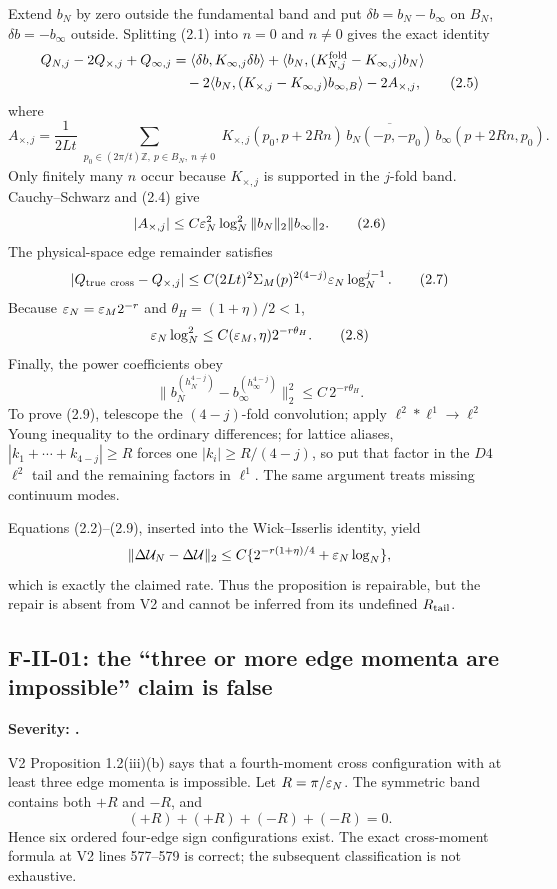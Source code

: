 \documentclass[11pt,a4paper]{article}
\begin{document}
Extend $b_N$ by zero outside the fundamental band and put
$\delta b=b_N-b_\infty$ on $B_N$, $\delta b=-b_\infty$ outside.  Splitting (2.1) into
$n=0$ and $n\ne0$ gives the exact identity
\begin{align*}
 Q_{N,j}-2Q_{\times,j}+Q_{\infty,j}
 &=\langle\delta b,K_{\infty,j}\delta b\rangle
 +\langle b_N,(K_{N,j}^{\rm fold}-K_{\infty,j})b_N\rangle\\
 &\quad-2\langle b_N,(K_{\times,j}-K_{\infty,j})b_{\infty,B}\rangle
 -2A_{\times,j},\tag{2.5}
\end{align*}
where
\[
 A_{\times,j}=\frac1{2Lt}
 \sum_{\substack{p_0\in(2\pi/t)\mathbb Z,\ p\in B_N,\ n\ne0}}
 K_{\times,j}(p_0,p+2Rn)\,
 \overline{b_N(-p,-p_0)}\,b_\infty(p+2Rn,p_0).
\]
Only finitely many $n$ occur because $K_{\times,j}$ is supported in the $j$-fold band.
Cauchy--Schwarz and (2.4) give
\[
 |A_{\times,j}|\le C\varepsilon_N^2\log_N^2
 \|b_N\|_2\|b_\infty\|_2.\tag{2.6}
\]
The physical-space edge remainder satisfies
\[
 |Q_{\rm true\ cross}-Q_{\times,j}|
 \le C(2Lt)^2\Sigma_M(p)^{2(4-j)}\eps_N\log_N^{j-1}.
 \tag{2.7}
\]
Because $\varepsilon_N=\varepsilon_M2^{-r}$ and
$\theta_H=(1+\eta)/2<1$,
\[
 \varepsilon_N\log_N^2\le C(\varepsilon_M,\eta)2^{-r\theta_H}.
 \tag{2.8}
\]
Finally, the power coefficients obey
\[
 \|b_N^{(h_N^{4-j})}-b_\infty^{(h_\infty^{4-j})}\|_2^2
 \le C\,2^{-r\theta_H}.\tag{2.9}
\]
To prove (2.9), telescope the $(4-j)$-fold convolution; apply
$\ell^2*\ell^1\to\ell^2$ Young inequality to the ordinary differences; for lattice
aliases, $|k_1+\cdots+k_{4-j}|\ge R$ forces one
$|k_i|\ge R/(4-j)$, so put that factor in the $D4$ $\ell^2$ tail and the remaining
factors in $\ell^1$.  The same argument treats missing continuum modes.

Equations (2.2)--(2.9), inserted into the Wick--Isserlis identity, yield
\[
 \|\Delta\mathcal U_N-\Delta\mathcal U\|_2
 \le C\{2^{-r(1+\eta)/4}+\varepsilon_N\log_N\},
\]
which is exactly the claimed rate.  Thus the proposition is repairable, but the repair
is absent from V2 and cannot be inferred from its undefined $R_{\rm tail}$.

\subsection{F-II-01: the ``three or more edge momenta are impossible'' claim is false}

\begin{finding}
\textbf{Severity: \Major.}

V2 Proposition 1.2(iii)(b) says that a fourth-moment cross configuration with at
least three edge momenta is impossible.  Let $R=\pi/\varepsilon_N$.  The symmetric band contains
both $+R$ and $-R$, and
\[
 (+R)+(+R)+(-R)+(-R)=0.
\]
Hence six ordered four-edge sign configurations exist.  The exact cross-moment formula
at V2 lines 577--579 is correct; the subsequent classification is not exhaustive.
\end{finding}
\end{document}
